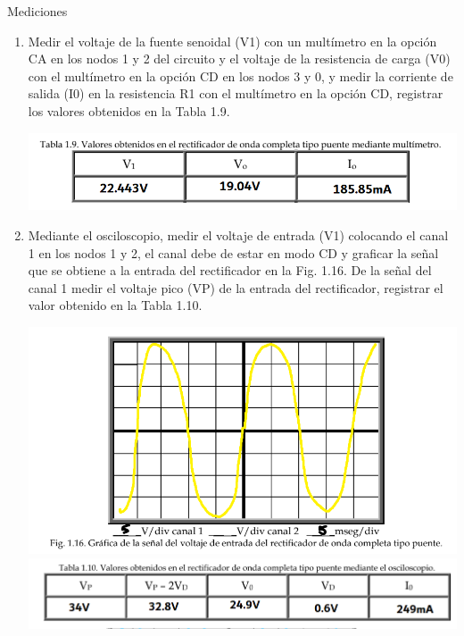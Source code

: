 \documentclass[12pt]{article}
\begin{document}
\begin{enumerate}
\begin{center}
            \end{center}
            Mediciones\par
            \begin{enumerate}
                \item Medir el voltaje de la fuente senoidal (V1) con un multímetro en la opción CA en los nodos
                1 y 2 del circuito y el voltaje de la resistencia de carga (V0) con el multímetro en la opción
                CD en los nodos 3 y 0, y medir la corriente de salida (I0) en la resistencia R1 con el
                multímetro en la opción CD, registrar los valores obtenidos en la Tabla 1.9.
                \begin{center}
                    \includegraphics*[scale=0.6]{tabla1-9.png}
                \end{center}
                \item Mediante el osciloscopio, medir el voltaje de entrada (V1) colocando el canal 1 en los nodos
                1 y 2, el canal debe de estar en modo CD y graficar la señal que se obtiene a la entrada del
                rectificador en la Fig. 1.16. De la señal del canal 1 medir el voltaje pico (VP) de la entrada
                del rectificador, registrar el valor obtenido en la Tabla 1.10.
                \begin{center}
                    \includegraphics*[scale=0.45]{fig1-16.png}
                    \includegraphics*[scale=0.45]{tabla1-10.png}

\end{center}
\end{enumerate}
\end{enumerate}
\end{document}
